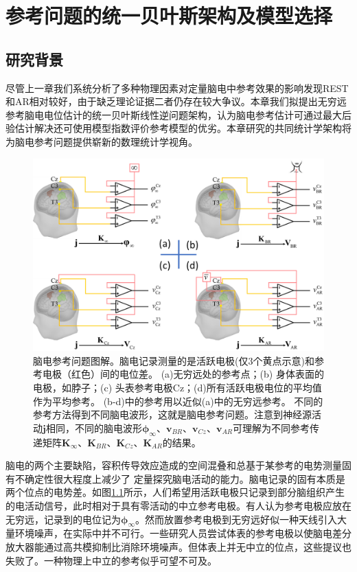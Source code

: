 \chapter{参考问题的统一贝叶斯架构及模型选择}
\section{研究背景}
尽管上一章我们系统分析了多种物理因素对定量脑电中参考效果的影响发现REST和AR相对较好，由于缺乏理论证据二者仍存在较大争议。本章我们拟提出无穷远参考脑电电位估计的统一贝叶斯线性逆问题架构，认为脑电参考估计可通过最大后验估计解决还可使用模型指数评价参考模型的优劣。本章研究的共同统计学架构将为脑电参考问题提供崭新的数理统计学视角。
\begin{figure}[!h]
	\centering
	\includegraphics[width=15cm]{pic/Frontier/figure1.png}
	\caption{脑电参考问题图解。脑电记录测量的是活跃电极(仅3个黄点示意)和参考电极（红色）间的电位差。 (a)无穷远处的参考点；(b) 身体表面的电极，如脖子；(c) 头表参考电极Cz；(d)所有活跃电极电位的平均值作为平均参考。 (b-d)中的参考用以近似(a)中的无穷远参考。 不同的参考方法得到不同脑电波形，这就是脑电参考问题。注意到神经源活动$\mathbf{j}$相同，不同的脑电波形$\mathbf{\phi}_\infty$、$\mathbf{v}_{BR}$、$\mathbf{v}_{Cz}$、$\mathbf{v}_{AR}$可理解为不同参考传递矩阵$\mathbf{K}_\infty$、$\mathbf{K}_{BR}$、$\mathbf{K}_{Cz}$、$\mathbf{K}_{AR}$的结果。}
	\label{3:1}
\end{figure}
脑电的两个主要缺陷，容积传导效应造成的空间混叠和总基于某参考的电势测量固有不确定性很大程度上减少了
定量探究脑电活动的能力。脑电记录的固有本质是两个位点的电势差。如图\ref{3:1}所示，人们希望用活跃电极只记录到部分脑组织产生的电活动信号，此时相对于具有零活动的中立参考电极。有人认为参考电极应放在无穷远，记录到的电位记为$\mathbf{\phi}_{\infty}$。然而放置参考电极到无穷远好似一种天线引入大量环境噪声，在实际中并不可行。一些研究人员尝试体表的参考电极以使脑电差分放大器能通过高共模抑制比消除环境噪声。但体表上并无中立的位点，这些提议也失败了。一种物理上中立的参考似乎可望不可及。

